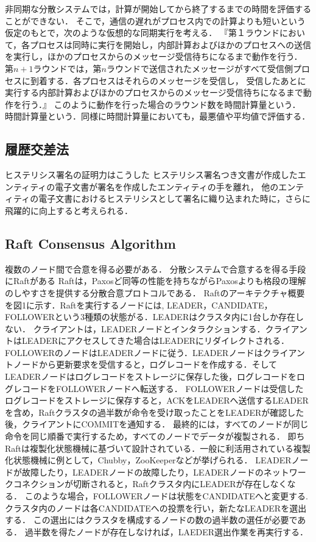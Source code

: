 \documentclass[a4paper,12pt]{jsarticle}
\begin{document}
非同期な分散システムでは，計算が開始してから終了するまでの時間を評価することができない．
そこで，通信の遅れがプロセス内での計算よりも短いという仮定のもとで，次のような仮想的な同期実行を考える．
『第１ラウンドにおいて，各プロセスは同時に実行を開始し，内部計算およびほかのプロセスへの送信を実行し，ほかのプロセスからのメッセージ受信待ちになるまで動作を行う．
第$n + 1$ラウンドでは，第$n$ラウンドで送信されたメッセージがすべて受信側プロセスに到着する．各プロセスはそれらのメッセージを受信し，
受信したあとに実行する内部計算およびほかのプロセスからのメッセージ受信待ちになるまで動作を行う．』
このように動作を行った場合のラウンド数を時間計算量という．
時間計算量という．同様に時間計算量においても，最悪値や平均値で評価する．

\subsection{履歴交差法}
ヒステリシス署名の証明力はこうした
ヒステリシス署名つき文書が作成したエンティティの電子文書が署名を作成したエンティティの手を離れ，
他のエンティティの電子文書におけるヒステリシスとして署名に織り込まれた時に，さらに飛躍的に向上すると考えられる．

\subsection{Raft Consensus Algorithm}\cite{Raft Consensus Algorithm}
\label{Raft}
複数のノード間で合意を得る必要がある．
分散システムで合意するを得る手段にRaftがある
Raftは，Paxosど同等の性能を持ちながらPaxosよりも格段の理解のしやすさを提供する分散合意プロトコルである．
Raftのアーキテクチャ概要を図1に示す．Raftを実行するノードには, LEADER，CANDIDATE，FOLLOWERという$3$種類の状態がる．LEADERはクラスタ内に1台しか存在しない．
クライアントは，LEADERノードとインタラクションする．クライアントはLEADERにアクセスしてきた場合はLEADERにリダイレクトされる．
FOLLOWERのノードはLEADERノードに従う．LEADERノードはクライアントノードから更新要求を受信すると，ログレコードを作成する．そしてLEADERノードはログレコードをストレージに保存した後，ログレコードをログレコードをFOLLOWERノードへ転送する．
FOLLOWERノードは受信したログレコードをストレージに保存すると，ACKをLEADERへ送信するLEADERを含め，Raftクラスタの過半数が命令を受け取ったことをLEADERが確認した後，クライアントにCOMMITを通知する．
最終的には，すべてのノードが同じ命令を同じ順番で実行するため，すべてのノードでデータが複製される．
即ちRaftは複製化状態機械に基づいて設計されている．一般に利活用されている複製化状態機械に例として，Chubby，ZooKeeperなどが挙げられる．
LEADERノードが故障したり，LEADERノードの故障したり，LEADERノードのネットワークコネクションが切断されると，Raftクラスタ内にLEADERが存在しなくなる．
このような場合，FOLLOWERノードは状態をCANDIDATEへと変更する.
クラスタ内のノードは各CANDIDATEへの投票を行い，新たなLEADERを選出する．
この選出にはクラスタを構成するノードの数の過半数の選任が必要である．
過半数を得たノードが存在しなければ，LAEDER選出作業を再実行する．
\end{document}
